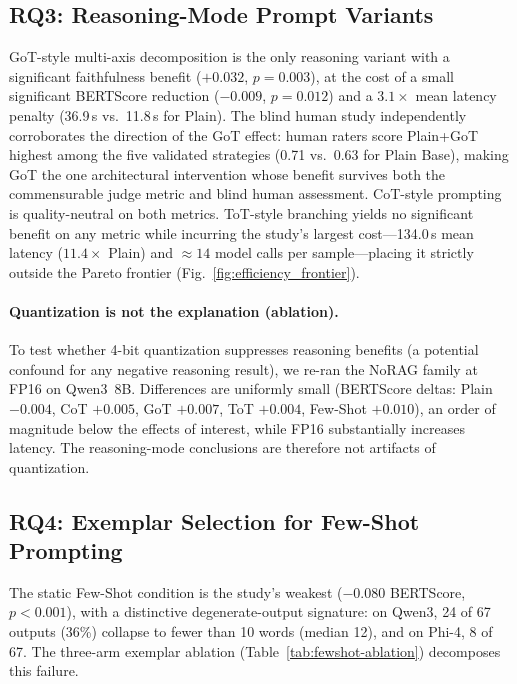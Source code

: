 \documentclass[pdflatex,sn-mathphys-ay]{sn-jnl}%
\theoremstyle{thmstyleone}%
\theoremstyle{thmstyletwo}%
\theoremstyle{thmstylethree}%
\begin{document}
\subsection{RQ3: Reasoning-Mode Prompt Variants}
\label{sec:rq3}
GoT-style multi-axis decomposition is the only reasoning variant with a significant faithfulness benefit ($+0.032$, $p=0.003$), at the cost of a small significant BERTScore reduction ($-0.009$, $p=0.012$) and a $3.1\times$ mean latency penalty (36.9\,s vs.\ 11.8\,s for Plain). The blind human study independently corroborates the direction of the GoT effect: human raters score Plain+GoT highest among the five validated strategies (0.71 vs.\ 0.63 for Plain Base), making GoT the one architectural intervention whose benefit survives both the commensurable judge metric and blind human assessment. CoT-style prompting is quality-neutral on both metrics. ToT-style branching yields no significant benefit on any metric while incurring the study's largest cost---134.0\,s mean latency ($11.4\times$ Plain) and ${\approx}14$ model calls per sample---placing it strictly outside the Pareto frontier (Fig.~\ref{fig:efficiency_frontier}).

\paragraph{Quantization is not the explanation (ablation).}
To test whether 4-bit quantization suppresses reasoning benefits (a potential confound for any negative reasoning result), we re-ran the NoRAG family at FP16 on Qwen3~8B. Differences are uniformly small (BERTScore deltas: Plain $-0.004$, CoT $+0.005$, GoT $+0.007$, ToT $+0.004$, Few-Shot $+0.010$), an order of magnitude below the effects of interest, while FP16 substantially increases latency. The reasoning-mode conclusions are therefore not artifacts of quantization.

\subsection{RQ4: Exemplar Selection for Few-Shot Prompting}
\label{sec:rq4}
The static Few-Shot condition is the study's weakest ($-0.080$ BERTScore, $p<0.001$), with a distinctive degenerate-output signature: on Qwen3, 24 of 67 outputs (36\%) collapse to fewer than 10 words (median 12), and on Phi-4, 8 of 67. The three-arm exemplar ablation (Table~\ref{tab:fewshot-ablation}) decomposes this failure.
\end{document}
